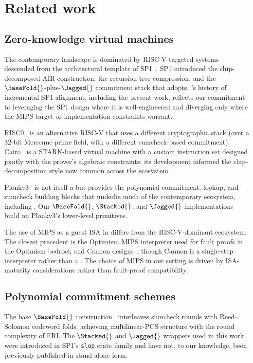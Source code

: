 \section{Related work}
\label{sec:related}

\subsection{Zero-knowledge virtual machines}

The contemporary \zkVM{} landscape is dominated by RISC-V-targeted systems descended from the architectural template of SP1~\citep{sp1}. SP1 introduced the chip-decomposed AIR construction, the recursion-tree compression, and the $\BaseFold{}$-plus-$\Jagged{}$ commitment stack that \Zirenver{} adopts. \Ziren{}'s history of incremental SP1 alignment, including the present work, reflects our commitment to leveraging the SP1 design where it is well-engineered and diverging only where the MIPS target or implementation constraints warrant.

RISC0~\citep{risc0} is an alternative RISC-V \zkVM{} that uses a different cryptographic stack (over a 32-bit Mersenne prime field, with a different sumcheck-based commitment). Cairo~\citep{cairo} is a STARK-based virtual machine with a custom instruction set designed jointly with the prover's algebraic constraints; its development informed the chip-decomposition style now common across the ecosystem.

Plonky3~\citep{plonky3} is not itself a \zkVM{} but provides the polynomial commitment, lookup, and sumcheck building blocks that underlie much of the contemporary \zkVM{} ecosystem, including \Zirenver{}. Our $\BaseFold{}$, $\Stacked{}$, and $\Jagged{}$ implementations build on Plonky3's lower-level primitives.

The use of MIPS as a guest ISA in \Zirenver{} differs from the RISC-V-dominant ecosystem. The closest precedent is the Optimism MIPS interpreter used for fault proofs in the Optimism bedrock and Cannon designs~\citep{cannon}, though Cannon is a single-step interpreter rather than a \zkVM{}. The choice of MIPS in our setting is driven by ISA-maturity considerations rather than fault-proof compatibility.

\subsection{Polynomial commitment schemes}

The base $\BaseFold{}$ construction~\citep{basefold} interleaves sumcheck rounds with Reed--Solomon codeword folds, achieving multilinear-PCS structure with the round complexity of FRI. The $\Stacked{}$ and $\Jagged{}$ wrappers used in this work were introduced in SP1's \texttt{slop} crate family and have not, to our knowledge, been previously published in stand-alone form.

